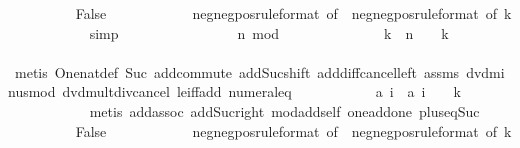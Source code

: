 \begin{isabellebody}
\ \ \ \ \ \ \ \ \isamarkupfalse%
\ False\isanewline
\ \ \ \ \ \ \ \ \ \ \isamarkupfalse%
\ neg{\isacharunderscore}neg{\isacharunderscore}pos{\isacharbrackleft}rule{\isacharunderscore}format{\isacharcomma}\ of\ {}{\isacharbrackright}\ neg{\isacharunderscore}neg{\isacharunderscore}pos{\isacharbrackleft}rule{\isacharunderscore}format{\isacharcomma}\ of\ k{\isacharbrackright}\isanewline
\ \ \ \ \ \ \ \ \ \ \isamarkupfalse%
\ simp\isanewline
\ \ \ \ \ \ \isamarkupfalse%
\isanewline
\ \ \ \ \ \ \ \ \isamarkupfalse%
\ {\isachardoublequoteopen}n\ mod\ {}\ {\isacharequal}\ {}{\isachardoublequoteclose}\isanewline
\ \ \ \ \ \ \ \ \isamarkupfalse%
\ \isamarkupfalse%
\ k\ \ {\isachardoublequoteopen}n\ {\isacharequal}\ {}\ {\isacharasterisk}\ k\ {\isacharplus}\ {}{\isachardoublequoteclose}\isanewline
\ \ \ \ \ \ \ \ \ \ \isamarkupfalse%
\ {\isacharparenleft}metis\ One{\isacharunderscore}nat{\isacharunderscore}def\ Suc{\isacharunderscore}{}\ add{\isachardot}commute\ add{\isacharunderscore}Suc{\isacharunderscore}shift\ add{\isacharunderscore}diff{\isacharunderscore}cancel{\isacharunderscore}left{\isacharprime}\ assms\ dvd{\isacharunderscore}minus{\isacharunderscore}mod\ dvd{\isacharunderscore}mult{\isacharunderscore}div{\isacharunderscore}cancel\ le{\isacharunderscore}iff{\isacharunderscore}add\ numeral{\isacharunderscore}{}{\isacharunderscore}eq{\isacharunderscore}{}{\isacharparenright}\isanewline
\ \ \ \ \ \ \ \ \isamarkupfalse%
\ \isamarkupfalse%
\ {\isachardoublequoteopen}{\isacharquery}a\ i\ {\isacharequal}\ {\isacharquery}a\ {\isacharparenleft}i\ {\isacharplus}\ {}\ {\isacharplus}\ {}{\isacharasterisk}k{\isacharparenright}{\isachardoublequoteclose}\isanewline
\ \ \ \ \ \ \ \ \ \ \isamarkupfalse%
\ {\isacharparenleft}metis\ add{\isachardot}assoc\ add{\isacharunderscore}Suc{\isacharunderscore}right\ mod{\isacharunderscore}add{\isacharunderscore}self{}\ one{\isacharunderscore}add{\isacharunderscore}one\ plus{\isacharunderscore}{}{\isacharunderscore}eq{\isacharunderscore}Suc{\isacharparenright}\isanewline
\ \ \ \ \ \ \ \ \isamarkupfalse%
\ False\isanewline
\ \ \ \ \ \ \ \ \ \ \isamarkupfalse%
\ neg{\isacharunderscore}neg{\isacharunderscore}pos{\isacharbrackleft}rule{\isacharunderscore}format{\isacharcomma}\ of\ {}{\isacharbrackright}\ neg{\isacharunderscore}neg{\isacharunderscore}pos{\isacharbrackleft}rule{\isacharunderscore}format{\isacharcomma}\ of\ k{\isacharbrackright}\isanewline

\end{isabellebody}
